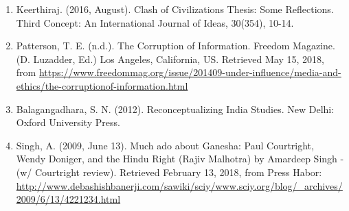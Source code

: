 \begin{multicols}{2}
\begin{enumerate}[label=$\bullet$]
\item Keerthiraj. (2016, August). Clash of Civilizations Thesis: Some Reflections. Third
Concept: An International Journal of Ideas, 30(354), 10-14.

\item Patterson, T. E. (n.d.). The Corruption of Information. Freedom Magazine. (D. Luzadder, Ed.) Los Angeles, California, US. Retrieved May 15, 2018, from \url{https://www.freedommag.org/issue/201409-under-influence/media-and-ethics/the-corruptionof-information.html}

\item Balagangadhara, S. N. (2012). Reconceptualizing India Studies. New Delhi: Oxford
University Press.

\item Singh, A. (2009, June 13). Much ado about Ganesha: Paul Courtright, Wendy Doniger, and
the Hindu Right (Rajiv Malhotra) by Amardeep Singh - (w/ Courtright review). Retrieved February 13, 2018, from Press Habor: \url{http://www.debashishbanerji.com/sawiki/sciy/www.sciy.org/blog/_archives/2009/6/13/4221234.html}
\end{enumerate}

\end{multicols}
\label{end2018-art5}

